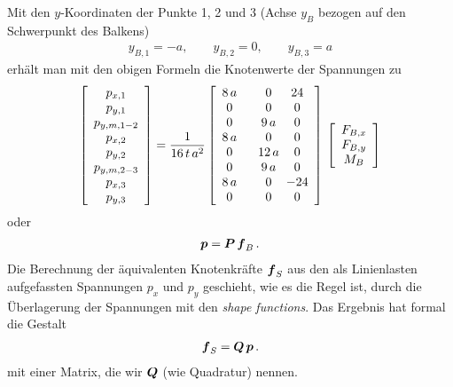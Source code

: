 {Mit den $y$-Koordinaten der Punkte 1, 2 und 3 (Achse $y_B$ bezogen auf den Schwerpunkt des Balkens)
\begin{align}
y_{B,1} = - a, \qquad y_{B,2} = 0, \qquad y_{B,3} = a
\end{align}
erh\"{a}lt man mit den obigen Formeln die Knotenwerte der Spannungen zu
\begin{align}
\left[\barr{c} p_{x,1} \\ p_{y,1}  \\p_{y,m,1-2} \\ p_{x,2} \\ p_{y,2} \\ p_{y,m,2-3} \\  p_{x,3} \\  p_{y,3}\earr \right] = \frac{ 1}{16\,t\,a^2}\left[\barr{c @{\hspace{6mm}} c @{\hspace{2mm}} c} 8\,a &0 & 24 \\ 0 & 0 & 0 \\ 0 & 9\,a & 0 \\ 8\,a &0 & 0 \\ 0 &12\,a &0 \\ 0 & 9\,a & 0 \\ 8\,a &0 & -24 \\ 0 & 0 &0  \earr \right]\,\left[\barr{c} F_{B,x} \\ F_{B,y} \\ M_B \earr \right]
\end{align}
oder
\begin{align}\label{Eq26}
\mbox{\boldmath $p$} = \mbox{\boldmath $P$}\,\mbox{\boldmath $f$}_B\,.
\end{align}
Die Berechnung der \"{a}quivalenten Knotenkr\"{a}fte $\mbox{\boldmath $f$}_S$ aus den als Linienlasten aufgefassten Spannungen $p_x$ und $p_y$ geschieht, wie es die Regel ist, durch die \"{U}berlagerung der Spannungen mit den {\em shape functions\/}. Das Ergebnis hat formal die Gestalt
\begin{align}
\mbox{\boldmath $f$}_S = \mbox{\boldmath $Q$}\,\mbox{\boldmath $p$}\,.
\end{align}
mit einer Matrix, die wir $\mbox{\boldmath $Q$}$ (wie Quadratur) nennen.

}
